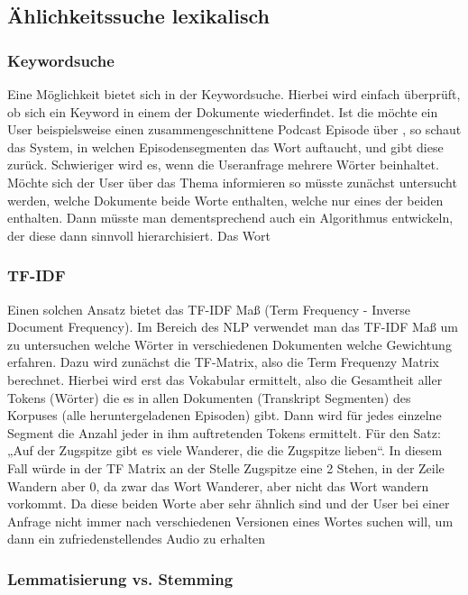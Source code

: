 \subsection{Ählichkeitssuche lexikalisch}

\subsubsection{Keywordsuche}

Eine Möglichkeit bietet sich in der Keywordsuche. 
Hierbei wird einfach überprüft, ob sich ein Keyword in einem der Dokumente wiederfindet. Ist die möchte ein User beispielsweise einen zusammengeschnittene Podcast Episode über , so schaut das System, in welchen Episodensegmenten das Wort  auftaucht, und gibt diese zurück. 
Schwieriger wird es, wenn die Useranfrage mehrere Wörter beinhaltet. 
Möchte sich der User über das Thema  informieren so müsste zunächst untersucht werden, welche Dokumente beide Worte enthalten, welche nur eines der beiden enthalten. 
Dann müsste man dementsprechend auch ein Algorithmus entwickeln, der diese dann sinnvoll hierarchisiert. 
Das Wort 

\subsubsection{TF-IDF}

Einen solchen Ansatz bietet das TF-IDF Maß (Term Frequency - Inverse Document Frequency). 
Im Bereich des NLP verwendet man das TF-IDF Maß um zu untersuchen welche Wörter in verschiedenen Dokumenten welche Gewichtung erfahren. 
Dazu wird zunächst die TF-Matrix, also die Term Frequenzy Matrix berechnet. 
Hierbei wird erst das Vokabular ermittelt, also die Gesamtheit aller Tokens (Wörter) die es in allen Dokumenten (Transkript Segmenten) des Korpuses (alle heruntergeladenen Episoden) gibt. 
Dann wird für jedes einzelne Segment die Anzahl jeder in ihm auftretenden Tokens ermittelt. 
Für den Satz: „Auf der Zugspitze gibt es viele Wanderer, die die Zugspitze lieben“. 
In diesem Fall würde in der TF Matrix an der Stelle Zugspitze eine 2 Stehen, in der Zeile Wandern aber 0, da zwar das Wort Wanderer, aber nicht das Wort wandern vorkommt. 
Da diese beiden Worte aber sehr ähnlich sind und der User bei einer Anfrage nicht immer nach verschiedenen Versionen eines Wortes suchen will, um dann ein zufriedenstellendes Audio zu erhalten

\subsubsection{Lemmatisierung vs. Stemming}

